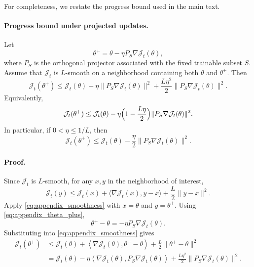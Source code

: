 \documentclass{article}
\begin{document}
For completeness, we restate the progress bound used in the main text.

\paragraph{Progress bound under projected updates.}
Let
\begin{equation}
\theta^+ = \theta - \eta P_S \nabla \mathcal{J}_t(\theta),
\label{eq:appendix_theta_plus}
\end{equation}
where $P_S$ is the orthogonal projector associated with the fixed trainable subset $S$. Assume that $\mathcal{J}_t$ is $L$-smooth on a neighborhood containing both $\theta$ and $\theta^+$. Then
\begin{equation}
\mathcal{J}_t(\theta^+)
\le
\mathcal{J}_t(\theta)
-
\eta \|P_S \nabla \mathcal{J}_t(\theta)\|^2
+
\frac{L\eta^2}{2}\|P_S \nabla \mathcal{J}_t(\theta)\|^2.
\label{eq:appendix_descent_1}
\end{equation}
Equivalently,
\begin{equation}
\mathcal{J}_t(\theta^+)
\le
\mathcal{J}_t(\theta)
-
\eta \Bigl(1-\frac{L\eta}{2}\Bigr)\|P_S \nabla \mathcal{J}_t(\theta)\|^2.
\label{eq:appendix_descent_2}
\end{equation}
In particular, if $0 < \eta \le 1/L$, then
\begin{equation}
\mathcal{J}_t(\theta^+)
\le
\mathcal{J}_t(\theta)
-
\frac{\eta}{2}\|P_S \nabla \mathcal{J}_t(\theta)\|^2.
\label{eq:appendix_descent_3}
\end{equation}

\paragraph{Proof.}
Since $\mathcal{J}_t$ is $L$-smooth, for any $x,y$ in the neighborhood of interest,
\begin{equation}
\mathcal{J}_t(y)
\le
\mathcal{J}_t(x)
+
\langle \nabla \mathcal{J}_t(x), y-x \rangle
+
\frac{L}{2}\|y-x\|^2.
\label{eq:appendix_smoothness}
\end{equation}
Apply \ref{eq:appendix_smoothness} with $x=\theta$ and $y=\theta^+$. Using \ref{eq:appendix_theta_plus},
\begin{equation}
\theta^+ - \theta = -\eta P_S \nabla \mathcal{J}_t(\theta).
\label{eq:appendix_step_diff}
\end{equation}
Substituting into \ref{eq:appendix_smoothness} gives
\begin{align}
\mathcal{J}_t(\theta^+)
&\le
\mathcal{J}_t(\theta)
+
\left\langle \nabla \mathcal{J}_t(\theta), \theta^+ - \theta \right\rangle
+
\frac{L}{2}\|\theta^+ - \theta\|^2 \\
&=
\mathcal{J}_t(\theta)
-
\eta \left\langle \nabla \mathcal{J}_t(\theta), P_S \nabla \mathcal{J}_t(\theta) \right\rangle
+
\frac{L\eta^2}{2}\|P_S \nabla \mathcal{J}_t(\theta)\|^2.
\label{eq:appendix_before_projector_identity}
\end{align}
\end{document}
